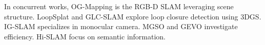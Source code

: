 In concurrent works, OG-Mapping \cite{OG-Mapping} is the RGB-D SLAM leveraging scene structure. LoopSplat \cite{LoopSplat} and GLC-SLAM \cite{GLC-SLAM_2409} explore loop closure detection using 3DGS. IG-SLAM \cite{IG-SLAM_202408} specializes in monocular camera. MGSO \cite{MGSO_2409} and GEVO \cite{GEVO2024} investigate efficiency. Hi-SLAM \cite{Hi-SLAM2024_GS} focus on semantic information.





